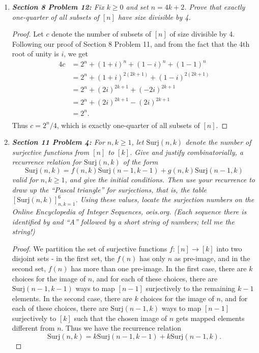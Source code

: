 \documentclass{article}
\begin{document}
\begin{enumerate}[label={\bf Q\arabic*:}]
  \item \it \textbf{Section 8 Problem 12:} Fix $k\geq0$ and set $n=4k+2$.
    Prove that exactly one-quarter of all subsets of $[n]$ have size
    divisible by 4.

    \begin{proof}
      Let $c$ denote the number of subsets of $[n]$ of size divisible by 4.
      Following our proof of Section 8 Problem 11, and from the fact that
      the 4th root of unity is $i$, we get
      \begin{align*}
        4c &=2^n +(1+i)^n +(1-i)^n +(1-1)^n\\
        &=2^n +(1+i)^{2(2k+1)} +(1-i)^{2(2k+1)}\\
        &=2^n +(2i)^{2k+1} +(-2i)^{2k+1}\\
        &=2^n +(2i)^{2k+1} -(2i)^{2k+1}\\
        &=2^n.\\
      \end{align*}
      Thus $c=2^n/4$, which is exactly one-quarter of all subsets of $[n]$.
    \end{proof}

  \item \it \textbf{Section 11 Problem 4:} For $n,k\geq1$, let
    $\text{Surj}(n,k)$ denote the number of surjective functions from $[n]$
    to $[k]$. Give and justify combinatorially, a recurrence relation for
    $\text{Surj}(n,k)$ of the form
    \[\text{Surj}(n,k) =f(n,k)\text{Surj}(n-1,k-1)
    +g(n,k)\text{Surj}(n-1,k)\]
    valid for $n,k\geq1$, and give the initial conditions. Then use your
    recurrence to draw up the ``Pascal triangle'' for surjections, that is,
    the table $[\text{Surj}(n,k)]_{n,k=1}^6$. Using these values, locate
    the surjection numbers on the Online Encyclopedia of Integer Sequences,
    oeis.org. (Each sequence there is identified by and ``A'' followed by a
    short string of numbers; tell me the string!)

    \begin{proof}
      We partition the set of surjective functions $f:[n]\rightarrow[k]$
      into two disjoint sets - in the first set, the $f(n)$ has only $n$ as
      pre-image, and in the second set, $f(n)$ has more than one pre-image.
      In the first case, there are $k$ choices for the image of $n$, and
      for each of these choices, there are $\text{Surj}(n-1,k-1)$ ways to
      map $[n-1]$ surjectively to the remaining $k-1$ elements. In the
      second case, there are $k$ choices for the image of $n$, and for
      each of these choices, there are $\text{Surj}(n-1,k)$ ways to map
      $[n-1]$ surjectively to $[k]$ such that the chosen image of $n$
      gets mapped elements different from $n$. Thus we have the
      recurrence relation
      \[\text{Surj}(n,k) =k\text{Surj}(n-1,k-1) +k\text{Surj}(n-1,k).\]


\end{proof}
\end{enumerate}
\end{document}
